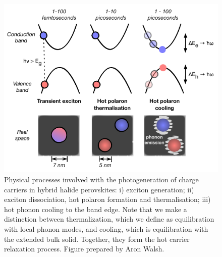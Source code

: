 \begin{figure}[h!]
\centering
  \includegraphics[width=0.7\columnwidth]{figures/ch5/f1.pdf}
  \caption[Hot carrier cooling model]{Physical processes involved with the photogeneration of charge carriers in hybrid halide perovskites: i) exciton generation; ii) exciton dissociation, hot polaron formation and thermalisation; iii) hot phonon cooling to the band edge. Note that we make a distinction between thermalization, which we define as equilibration with local phonon modes, and cooling, which is equilibration with the extended bulk solid. Together, they form the hot carrier relaxation process. Figure prepared by Aron Walsh.}
\label{cooling_schematic}
\end{figure}

